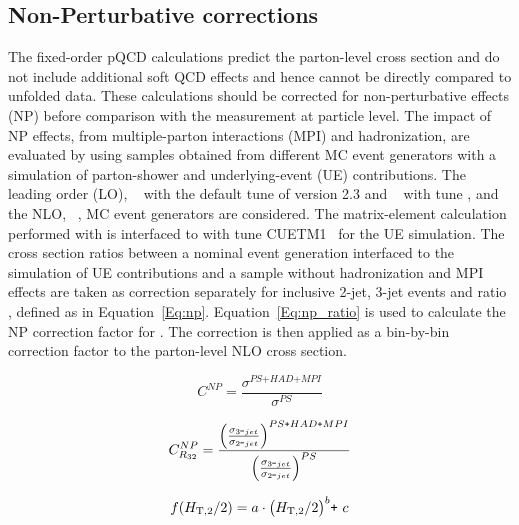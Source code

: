 \subsection{Non-Perturbative corrections}
\label{sec:NPcorr}
The fixed-order pQCD calculations predict the parton-level cross section and 
do not include additional soft QCD effects
and hence cannot be directly compared to unfolded data. These calculations 
should be corrected for non-perturbative effects (NP) before comparison
with the measurement at particle level. The impact of NP effects, \ie from multiple-parton
interactions (MPI) and hadronization, are evaluated by using samples
obtained from different MC event generators with a simulation of
parton-shower and underlying-event (UE)
contributions. The leading order (LO), 
\HERWIGPP~\cite{Bahr:2008pv} with the default tune of version 2.3 and \PYTHIAS~\cite{Sjostrand:2006za} 
with tune \Ztwostar, and the NLO, \POWHEG~\cite{Nason:2004rx,Frixione:2007vw,Alioli:2010xa}, MC event generators are considered. 
The matrix-element calculation performed with \POWHEG is interfaced to \PYTHIAE with tune CUETM1~\cite{Khachatryan:2015pea} for the UE simulation. The cross section ratios between a nominal event
generation interfaced to the simulation of UE contributions and a
sample without hadronization and MPI effects are taken as correction
separately for inclusive 2-jet, 3-jet events and ratio \ratio, defined as in Equation~\ref{Eq:np}. Equation~\ref{Eq:np_ratio} is used to calculate the NP correction factor for \ratio. The correction is then applied as a bin-by-bin correction factor to the parton-level
NLO cross section. 

\begin{equation}
  \label{Eq:np}
  C^{NP} = \frac{\sigma^{PS\texttt{+}HAD\texttt{+}MPI}}{\sigma^{PS}}
\end{equation}


\begin{equation}
  \label{Eq:np_ratio}
  C^{NP}_{\ratio} = \frac{\Big(\frac{\sigma_{3\mbox{-}jet}}{\sigma_{2\mbox{-}jet}}\Big)^{PS\texttt{+}HAD\texttt{+}MPI}}{\Big(\frac{\sigma_{3\mbox{-}jet}}{\sigma_{2\mbox{-}jet}}\Big)^{PS}}
\end{equation}

\begin{equation}
  \label{Eq:power}
  f(H_{\mathrm{T,2}}/2) = a\cdot\big(H_{\mathrm{T,2}}/2\big)^{b}\texttt{+}~c
\end{equation}

